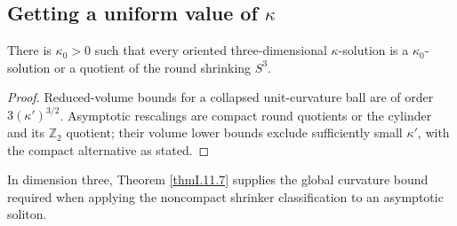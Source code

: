 \subsection{Getting a uniform value of $\kappa$}
\label{secI.11.9}
\begin{proposition}
\label{prop:kl-getting-uniform-value-existence-kappa-solutions}

\label{propI.11.9}
There is $\kappa_0>0$ such that every oriented three-dimensional
$\kappa$-solution is a $\kappa_0$-solution or a quotient of the round
shrinking $S^3$.
\end{proposition}
\begin{proof}
\sketch Reduced-volume bounds for a collapsed unit-curvature ball are of
order $3(\kappa')^{3/2}$.  Asymptotic rescalings are compact round quotients
or the cylinder and its $\mathbb Z_2$ quotient; their volume lower bounds
exclude sufficiently small $\kappa'$, with the compact alternative as stated.
\end{proof}
\begin{remark}
\label{rem:kl-getting-uniform-value-existence-ricci-solitons}


In dimension three, Theorem \ref{thmI.11.7} supplies the global curvature
bound required when applying the noncompact shrinker classification to an
asymptotic soliton.
\end{remark}

